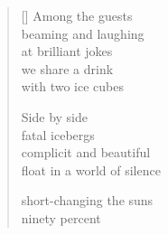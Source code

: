 \documentclass[12pt,a4paper]{article}
\begin{document}
\thispagestyle{empty}

\poemtitle{}

\settowidth{\versewidth}{float in a world of silence}

\bigskip

\begin{verse}[\versewidth]
  Among the guests \\
  beaming and laughing \\
  at brilliant jokes\\
  we share a drink\\
  with two ice cubes

  Side by side \\
  fatal icebergs\\
  complicit and beautiful \\
  float in a world of silence

  short-changing the suns\\
  ninety percent
\end{verse}
\end{document}

